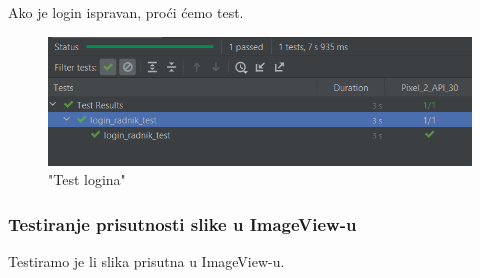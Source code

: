		Ako je login ispravan, proći ćemo test.
		
		\begin{figure}[H]
			\centering
			\includegraphics[scale=0.5]{./slike/test1.png}
			\caption{"Test logina"}
			\label{fig:test1}
		\end{figure}\eject
	
		\subsubsection{Testiranje prisutnosti slike u ImageView-u}
	Testiramo je li slika prisutna u ImageView-u.
